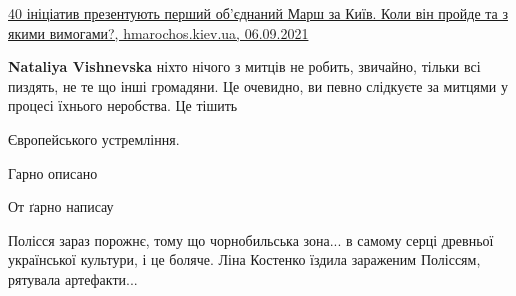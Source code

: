 \begin{itemize}
\href{https://hmarochos.kiev.ua/2021/09/06/40-inicziatyv-prezentuyut-pershyj-obyednanyj-marsh-za-kyyiv-koly-vin-projde-ta-z-yakymy-vymogamy/}{%
40 ініціатив презентують перший об'єднаний Марш за Київ. %
Коли він пройде та з якими вимогами?, %
hmarochos.kiev.ua, 06.09.2021%
}

\begin{itemize} %
\textbf{Nataliya Vishnevska} ніхто нічого з митців не робить, звичайно, тільки всі пиздять, не те що інші громадяни. Це очевидно, ви певно слідкуєте за митцями у процесі їхнього неробства. Це тішить
\end{itemize} %


Європейського устремління.

Гарно описано

От ґарно написау


Полісся зараз порожнє, тому що чорнобильська зона...
в самому серці древньої української культури, і це боляче.
Ліна Костенко їздила зараженим Поліссям, рятувала артефакти...

\end{itemize} %
